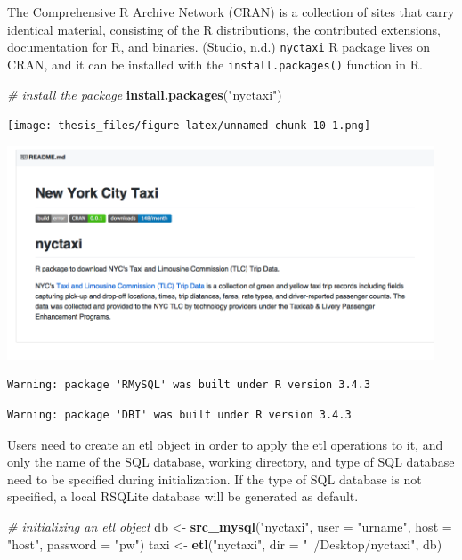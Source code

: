 \documentclass[12pt,twoside]{reedthesis}
\newenvironment{Shaded}{\begin{snugshade}}{\end{snugshade}}
\newcommand{\KeywordTok}[1]{\textcolor[rgb]{0.13,0.29,0.53}{\textbf{#1}}}
\newcommand{\DataTypeTok}[1]{\textcolor[rgb]{0.13,0.29,0.53}{#1}}
\newcommand{\StringTok}[1]{\textcolor[rgb]{0.31,0.60,0.02}{#1}}
\newcommand{\CommentTok}[1]{\textcolor[rgb]{0.56,0.35,0.01}{\textit{#1}}}
\newcommand{\NormalTok}[1]{#1}
\theoremstyle{definition}
\theoremstyle{definition}
\theoremstyle{definition}
\theoremstyle{remark}
\begin{document}
The Comprehensive R Archive Network (CRAN) is a collection of sites that
carry identical material, consisting of the R distributions, the
contributed extensions, documentation for R, and binaries. (Studio,
n.d.) \texttt{nyctaxi} R package lives on CRAN, and it can be installed
with the \texttt{install.packages()} function in R.
\begin{Shaded}
\begin{Highlighting}[]
\CommentTok{# install the package}
\KeywordTok{install.packages}\NormalTok{(}\StringTok{"nyctaxi"}\NormalTok{)}
\end{Highlighting}
\end{Shaded}
\texttt{[image: thesis\_files/figure-latex/unnamed-chunk-10-1.png]}
\begin{center}\includegraphics[width=5in]{figure/nyctaxi-page} \end{center}
\begin{verbatim}
Warning: package 'RMySQL' was built under R version 3.4.3
\end{verbatim}
\begin{verbatim}
Warning: package 'DBI' was built under R version 3.4.3
\end{verbatim}
Users need to create an etl object in order to apply the etl operations
to it, and only the name of the SQL database, working directory, and
type of SQL database need to be specified during initialization. If the
type of SQL database is not specified, a local RSQLite database will be
generated as default.
\begin{Shaded}
\begin{Highlighting}[]
\CommentTok{# initializing an etl object}
\NormalTok{db <-}\StringTok{ }\KeywordTok{src_mysql}\NormalTok{(}\StringTok{"nyctaxi"}\NormalTok{, }\DataTypeTok{user =} \StringTok{"urname"}\NormalTok{, }\DataTypeTok{host =} \StringTok{"host"}\NormalTok{, }
    \DataTypeTok{password =} \StringTok{"pw"}\NormalTok{)}
\NormalTok{taxi <-}\StringTok{ }\KeywordTok{etl}\NormalTok{(}\StringTok{"nyctaxi"}\NormalTok{, }\DataTypeTok{dir =} \StringTok{"~/Desktop/nyctaxi"}\NormalTok{, db)}
\end{Highlighting}
\end{Shaded}
\end{document}
